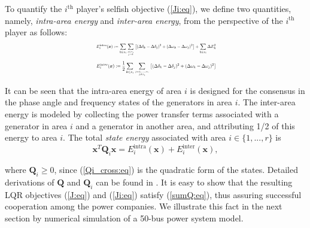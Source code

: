 \documentclass[12pt, draftclsnofoot,onecolumn]{IEEEtran}
\newcommand{\eqratio}{0.42}
\newcommand{\eqratio}{0.55}
\begin{document}
To quantify the $i^{\mathrm{th}}$ player's selfish objective (\ref{Ji:eq}), we define two quantities, namely, {\it intra-area energy} and {\it inter-area energy}, from the perspective of the $i^{\mathrm{th}}$ player as follows:
\begin{gather}
\resizebox{\eqratio\textwidth}{!}{
$\begin{aligned}
\label{Ei_intra:eq}
E_i^{\mathrm{intra}}({\boldsymbol{x}}):=\sum_{k\in s_i}\sum_{j\in s_i \atop j>k}{\big[(\Delta \delta_k-\Delta \delta_j)^2 +(\Delta \omega_k-\Delta \omega_j)^2\big]} + \sum_{k\in s_i}{\Delta E_k^2 }\\
\end{aligned}$}\raisetag{1\baselineskip}
\end{gather} 
\vspace{-9pt}
\begin{gather}
\resizebox{\eqratio\textwidth}{!}{
$\begin{aligned}
E_i^{\mathrm{inter}}(\boldsymbol{x}):=
\frac{1}{2}\sum_{k\in s_i}\sum_{j=1,...,n,\atop j \notin s_i}{\big[(\Delta \delta_k-\Delta \delta_j)^2 + (\Delta \omega_k-\Delta \omega_j)^2\big]}
\label{Ei_inter:eq}
\end{aligned}$}\raisetag{1\baselineskip}
\end{gather} 

\noindent
It can be seen that the intra-area energy of area $i$ is designed for the consensus in the phase angle and frequency states of the generators in area $i$. The inter-area energy is modeled by collecting the power transfer terms associated with a generator in area $i$ and a generator in another area, and attributing 1/2 of this energy to area $i$.
\noindent The total {\it state energy} associated with area $i\in\{1,...,r\}$ is 
\begin{equation}
{\boldsymbol x}^T{\boldsymbol Q}_i{\boldsymbol x} = E_i^{\mathrm{intra}}(\boldsymbol{x}) + E_i^{\mathrm{inter}}(\boldsymbol{x}),
\label{Qi_cross:eq}
\end{equation}

\noindent where $\boldsymbol{Q}_i \geq 0$, since (\ref{Qi_cross:eq}) is the quadratic form of the states. Detailed derivations of ${\boldsymbol Q}$ and ${\boldsymbol Q}_i$ can be found in \cite{Lian:aa}. It is easy to show that the resulting LQR objectives (\ref{J:eq}) and (\ref{Ji:eq}) satisfy (\ref{sumQ:eq}), thus assuring successful cooperation among the power companies. We illustrate this fact in the next section by numerical simulation of a 50-bus power system model.
\end{document}
